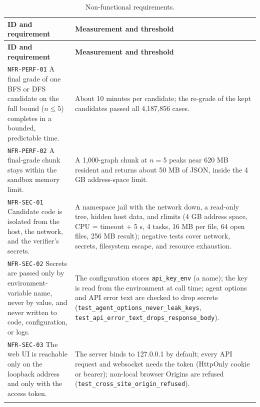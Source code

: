 \begingroup\footnotesize
\begin{longtable}{@{}>{\raggedright\arraybackslash}p{}>{\raggedright\arraybackslash}p{}@{}}
\caption{Non-functional requirements.}\label{tab:nfr}\\
\toprule
\textbf{ID and requirement} & \textbf{Measurement and threshold} \\
\midrule
\endfirsthead
\toprule
\textbf{ID and requirement} & \textbf{Measurement and threshold} \\
\midrule
\endhead
\bottomrule
\endfoot

\texttt{NFR-PERF-01} A final grade of one BFS or DFS candidate on the full bound
($n \le 5$) completes in a bounded, predictable time. & About 10 minutes per
candidate; the re-grade of the kept candidates passed all 4,187,856 cases. \\
\addlinespace[2pt]

\texttt{NFR-PERF-02} A final-grade chunk stays within the sandbox memory limit. &
A 1,000-graph chunk at $n = 5$ peaks near 620 MB resident and returns about 50 MB
of JSON, inside the 4 GB address-space limit. \\
\addlinespace[2pt]

\texttt{NFR-SEC-01} Candidate code is isolated from the host, the network, and
the verifier's secrets. & A namespace jail with the network down, a read-only
tree, hidden host data, and rlimits (4 GB address space, CPU = timeout + 5 s, 4
tasks, 16 MB per file, 64 open files, 256 MB result); negative tests cover
network, secrets, filesystem escape, and resource exhaustion. \\
\addlinespace[2pt]

\texttt{NFR-SEC-02} Secrets are passed only by environment-variable name, never
by value, and never written to code, configuration, or logs. & The configuration
stores \texttt{api\_key\_env} (a name); the key is read from the environment at
call time; agent options and API error text are checked to drop secrets
(\texttt{test\_agent\_options\_never\_leak\_keys},
\texttt{test\_api\_error\_text\_drops\_response\_body}). \\
\addlinespace[2pt]

\texttt{NFR-SEC-03} The web UI is reachable only on the loopback address and
only with the access token. & The server binds to 127.0.0.1 by default; every API
request and websocket needs the token (HttpOnly cookie or bearer); non-local
browser Origins are refused
(\texttt{test\_cross\_site\_origin\_refused}). \\
\addlinespace[2pt]


\end{longtable}
